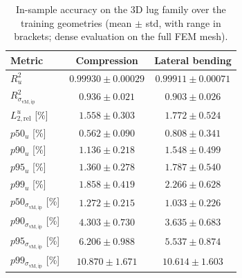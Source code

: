 \begin{table}[t]
\centering
\caption{In-sample accuracy on the 3D lug family over the training geometries (mean $\pm$ std, with range in brackets; dense evaluation on the full FEM mesh).}
\label{tab:lug_train_metrics}
\small
\begin{tabular}{lcc}
\toprule
Metric & Compression & Lateral bending \\
\midrule
$R^2_u$
& $0.99930 \pm 0.00029$ \; [$0.99782,\,0.99961$]
& $0.99911 \pm 0.00071$ \; [$0.99584,\,0.99964$] \\
$R^2_{\sigma_{\mathrm{vM,ip}}}$
& $0.936 \pm 0.021$ \; [$0.875,\,0.970$]
& $0.903 \pm 0.026$ \; [$0.814,\,0.940$] \\
$L_{2,\mathrm{rel}}^u$ [\%]
& $1.558 \pm 0.303$ \; [$1.155,\,2.671$]
& $1.772 \pm 0.524$ \; [$1.200,\,3.636$] \\
$p50_u$ [\%]
& $0.562 \pm 0.090$ \; [$0.433,\,0.934$]
& $0.808 \pm 0.341$ \; [$0.504,\,2.137$] \\
$p90_u$ [\%]
& $1.136 \pm 0.218$ \; [$0.859,\,2.083$]
& $1.548 \pm 0.499$ \; [$1.032,\,3.325$] \\
$p95_u$ [\%]
& $1.360 \pm 0.278$ \; [$1.008,\,2.541$]
& $1.787 \pm 0.540$ \; [$1.226,\,3.674$] \\
$p99_u$ [\%]
& $1.858 \pm 0.419$ \; [$1.342,\,3.433$]
& $2.266 \pm 0.628$ \; [$1.604,\,4.429$] \\
$p50_{\sigma_{\mathrm{vM,ip}}}$ [\%]
& $1.272 \pm 0.215$ \; [$0.901,\,1.875$]
& $1.033 \pm 0.226$ \; [$0.747,\,1.739$] \\
$p90_{\sigma_{\mathrm{vM,ip}}}$ [\%]
& $4.303 \pm 0.730$ \; [$3.020,\,6.005$]
& $3.635 \pm 0.683$ \; [$2.529,\,5.512$] \\
$p95_{\sigma_{\mathrm{vM,ip}}}$ [\%]
& $6.206 \pm 0.988$ \; [$4.290,\,8.343$]
& $5.537 \pm 0.874$ \; [$3.735,\,7.466$] \\
$p99_{\sigma_{\mathrm{vM,ip}}}$ [\%]
& $10.870 \pm 1.671$ \; [$7.272,\,14.320$]
& $10.614 \pm 1.603$ \; [$7.838,\,14.015$] \\
\bottomrule
\end{tabular}
\end{table}


